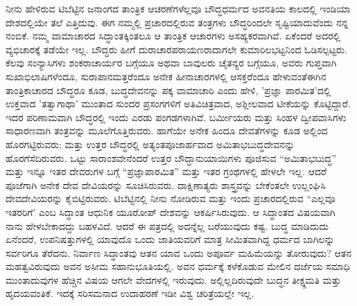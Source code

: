 ನೀನು ಹೇಳಿರುವ ಟಿಬೆಟ್ಟಿನ ಜನಾಂಗದ ತಾಂತ್ರಿಕ ಆಚರಣೆಗಳೆಲ್ಲವೂ ಬೌದ್ಧಧರ್ಮದ ಅವನತಿಯ ಕಾಲದಲ್ಲಿ ಇಂಡಿಯಾ ದೇಶದಲ್ಲಿಯೇ ತಲೆ ಎತ್ತಿದುವು. ಈಗ ನಮ್ಮಲ್ಲಿ ಪ್ರಚಾರದಲ್ಲಿರುವ ತಂತ್ರಗಳು ಬೌದ್ಧರಿಂದಲೇ ಸೃಷ್ಟಿಯಾದುವೆಂದು ನನ್ನ ನಂಬಿಕೆ. ನಮ್ಮ ವಾಮಾಚಾರದ ಸಿದ್ಧಾಂತಕ್ಕಿಂತಲೂ ಆ ತಾಂತ್ರಿಕ ಆಚಾರಗಳು ಅಸಹ್ಯಕರವಾಗಿವೆ. ಏಕೆಂದರೆ ಅದರಲ್ಲಿ ವ್ಯಭಿಚಾರಕ್ಕೆ ತಡೆಯೇ ಇಲ್ಲ. ಬೌದ್ಧರು ಹೀಗೆ ದುರಾಚಾರಪರಾಯಣರಾದಾಗಲೇ ಕುಮಾರಿಲಭಟ್ಟನಿಂದ ಓಡಿಸಲ್ಪಟ್ಟರು. ಕೆಲವು ಸಂನ್ಯಾಸಿಗಳು ಶಂಕರಾಚಾರ್ಯರ ಬಗ್ಗೆಯೂ ಅಥವಾ ಬಾವುಲರು ಚೈತನ್ಯರ ಬಗ್ಗೆಯೂ, ಅವರು ಗುಪ್ತವಾಗಿ ಸುಖಾಭಿಲಾಷಿಗಳೆಂದೂ, ಸುರಾಪಾನಮತ್ತರೆಂದೂ ಅನೇಕ ಹೀನಾಚಾರಗಳಲ್ಲಿ ಆಸಕ್ತರೆಂದೂ ಹೇಳುವಂತೆ\enginline{-}ಈಗಿನ ತಾಂತ್ರಿಕಾಚಾರದ ಬೌದ್ಧರೂ ಕೂಡ, ಬುದ್ಧದೇವನನ್ನು ಪಕ್ಕ ವಾಮಾಚಾರಿ ಎಂದು ಹೇಳಿ, ’ಪ್ರಜ್ಞಾ ಪಾರಮಿತ’ದಲ್ಲಿ ಉಕ್ತವಾದ ’ತತ್ವಾಗಾಥಾ’ ಮುಂತಾದ ಸುಂದರ ಪ್ರಸಂಗಗಳಿಗೆ ಅತಿವಿಚಿತ್ರವಾದ, ಅಶ್ಲೀಲವಾದ ಟೀಕೆಯನ್ನು ಕೊಟ್ಟಿದ್ದಾರೆ. ಇದರ ಪರಿಣಾಮವಾಗಿ ಬೌದ್ಧರಲ್ಲಿ ಇಂದು ಎರಡು ಪಂಗಡಗಳಾಗಿವೆ. ಬರ್ಮೀಯರು ಮತ್ತು ಸಿಂಹಳ ದ್ವೀಪವಾಸಿಗಳು ಸಾಧಾರಣವಾಗಿ ತಂತ್ರವನ್ನು ಮೂಲೆಗೊತ್ತಿರುವರು. ಹಾಗೆಯೇ ಅನೇಕ ಹಿಂದೂ ದೇವತೆಗಳನ್ನು ಕೂಡ ಅಲ್ಲಿಂದ ಹೊರಗಟ್ಟಿರುವರು; ಮತ್ತು ಉತ್ತರ ಬೌದ್ಧರಲ್ಲಿ ಅತ್ಯಂತ\break ಪೂಜಾರ್ಹವಾದ ಅಮಿತಾಭಬುದ್ಧದೇವನನ್ನು ಹೊರಗೆಸೆದಿರುವರು. ಒಟ್ಟು ಸಾರಾಂಶವೇನೆಂದರೆ ಉತ್ತರ ಬೌದ್ಧಾನುಯಾಯಿಗಳು ಪೂಜಿಸುವ “ಅಮಿತಾಭಬುದ್ಧ” ಮತ್ತು ಇನ್ನೂ ಇತರ ದೇವರುಗಳ ಬಗ್ಗೆ “ಪ್ರಜ್ಞಾಪಾರಮಿತ” ಮತ್ತು ಇತರ ಗ್ರಂಥಗಳಲ್ಲಿ ಹೇಳಲೇ ಇಲ್ಲ. ಆದರೆ ಪೂಜೆಗಾಗಿ ಅನೇಕ ದೇವ ದೇವಿಯರನ್ನು ಸೂಚಿಸಿರುವರು. ದಾಕ್ಷಿಣಾತ್ಯರು ಶಾಸ್ತ್ರವನ್ನು ಬೇಕೆಂತಲೇ ಉಲ್ಲಂಘಿಸಿ ದೇವದೇವಿಯರನ್ನು ಕೈಬಿಟ್ಟಿರುವರು. ಟಿಬೆಟ್ಟಿನಲ್ಲಿ ನೀನು ನೋಡಿರುವ ಮತ್ತು ಇಂದು ಪ್ರಚಾರದಲ್ಲಿರುವ “ಎಲ್ಲವೂ ಇತರರಿಗೆ’ ಎಂಬ ಸಿದ್ಧಾಂತ ಆಧುನಿಕ ಯೂರೋಪ್ ದೇಶವನ್ನು ಆಕರ್ಷಿಸಿರುವುದು. ಆ ಸಿದ್ಧಾಂತದ ವಿಷಯವಾಗಿ ನಾನು ಹೇಳಬೇಕಾದದ್ದು ಬಹಳವಿದೆ. ಆದರೆ ಈ ಪತ್ರದಲ್ಲಿ ಅದನ್ನೆಲ್ಲ ಬರೆಯುವುದು ಕಷ್ಟ. ಬುದ್ಧ ಮಾಡಿದುದು ಏನೆಂದರೆ, ಉಪನಿಷತ್ತುಗಳಲ್ಲಿ ಯಾವುದೊ ಒಂದು ಜಾತಿಯವರಿಗೆ ಮಾತ್ರ ಸೀಮಿತವಾಗಿದ್ದ ಧರ್ಮದ ಬಾಗಿಲನ್ನು ಸರ್ವರಿಗೂ ತೆರೆದನು. ನಿರ್ವಾಣ ಸಿದ್ಧಾಂತವು ಆತನ ಯಾವ ಒಂದು ಅಪೂರ್ವ ಮಹಿಮೆಯನ್ನು ತೋರುವುದು? ಆತನ ಮಹತ್ವವಿರುವುದು ಅವನ ಅಸೀಮ ಸಹಾನುಭೂತಿಯಲ್ಲಿ. ಅವನ ಧರ್ಮಕ್ಕೆ ಕಳೆಕೊಡುವ ಮೇಲಿನ ದರ್ಜೆಯ ಸಮಾಧಿ ಮುಂತಾದುವುಗಳ ಹೆಚ್ಚಿನ ವಿಷಯ ಆಗಲೇ ವೇದಗಳಲ್ಲಿ ಇರುವುದು. ಅಲ್ಲಿಲ್ಲದಿರುವುದೇ ಬುದ್ಧನ ತೀಕ್ಷ್ಣಮತಿ ಮತ್ತು ಹೃದಯವಂತಿಕೆ. ಇದಕ್ಕೆ ಸರಿಸಮನಾದ ಉದಾಹರಣೆ ಇಡೀ ವಿಶ್ವ ಚರಿತ್ರೆಯಲ್ಲೇ ಇಲ್ಲ.

